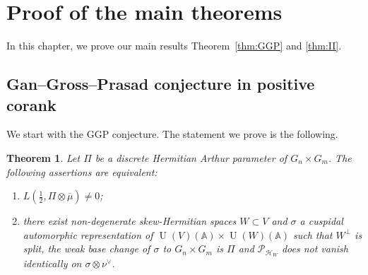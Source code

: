 \documentclass[letterpaper,11pt]{amsart}
\newcommand{\bA}{\mathbb{A}}
\newcommand{\cH}{\mathcal{H}}
\newcommand{\cP}{\mathcal{P}}
\newcommand{\<}{\negthickspace}
\DeclareMathOperator{\U}{U}
\theoremstyle{definition}
\theoremstyle{plain}
\newtheorem{theorem}[definition]{Theorem}
\theoremstyle{remark}
\numberwithin{equation}{section}
\begin{document}
\section{Proof of the main theorems}

In this chapter, we prove our main results Theorem~\ref{thm:GGP} and \ref{thm:II}.

\label{sec:proofs_positive}
\subsection{Gan--Gross--Prasad conjecture in positive corank}
\label{sec:GGP_positive_corank}

We start with the GGP conjecture. The statement we prove is the following.

\begin{theorem} \label{thm:GGP_arbitrary_corank}
Let $\Pi$ be a discrete Hermitian Arthur parameter of $G_n \times G_m$. The
following assertions are equivalent:
    \begin{enumerate}
        \item $L(\frac{1}{2}, \Pi \otimes \overline{\mu}) \neq 0$;
        \item there exist non-degenerate skew-Hermitian spaces $W\subset V$ and $\sigma$ a cuspidal automorphic representation of $\U(V)(\bA) \times \U(W)(\bA)$ such that $W^\perp$ is split, the weak base change of $\sigma$ to
            $G_n \times G_m$ is $\Pi$ and $\cP_{\cH_W}$ does not vanish identically on $\sigma \otimes
            \nu^\vee$.
    \end{enumerate}
\end{theorem}
\end{document}
